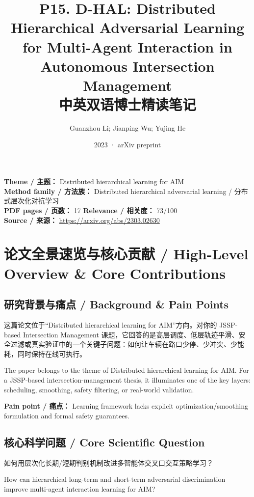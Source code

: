 \documentclass[UTF8,a4paper,11pt,fontset=fandol]{ctexart}
\title{P15. D-HAL: Distributed Hierarchical Adversarial Learning for Multi-Agent Interaction in Autonomous Intersection Management\\中英双语博士精读笔记}
\author{Guanzhou Li; Jianping Wu; Yujing He}
\date{2023 · arXiv preprint}
\begin{document}
\maketitle

\noindent\textbf{Theme / 主题：} Distributed hierarchical learning for AIM\\
\textbf{Method family / 方法族：} Distributed hierarchical adversarial learning / 分布式层次化对抗学习\\
\textbf{PDF pages / 页数：} 17 \quad
\textbf{Relevance / 相关度：} 73/100\\
\textbf{Source / 来源：} \url{https://arxiv.org/abs/2303.02630}

\section{论文全景速览与核心贡献 / High-Level Overview \& Core Contributions}
\subsection{研究背景与痛点 / Background \& Pain Points}
这篇论文位于“Distributed hierarchical learning for AIM”方向。对你的 JSSP-based Intersection Management 课题，它回答的是高层调度、低层轨迹平滑、安全过滤或真实验证中的一个关键子问题：如何让车辆在路口少停、少冲突、少能耗，同时保持在线可执行。

The paper belongs to the theme of Distributed hierarchical learning for AIM. For a JSSP-based intersection-management thesis, it illuminates one of the key layers: scheduling, smoothing, safety filtering, or real-world validation.

\textbf{Pain point / 痛点：} Learning framework lacks explicit optimization/smoothing formulation and formal safety guarantees.

\subsection{核心科学问题 / Core Scientific Question}
如何用层次化长期/短期判别机制改进多智能体交叉口交互策略学习？

How can hierarchical long-term and short-term adversarial discrimination improve multi-agent interaction learning for AIM?
\end{document}
